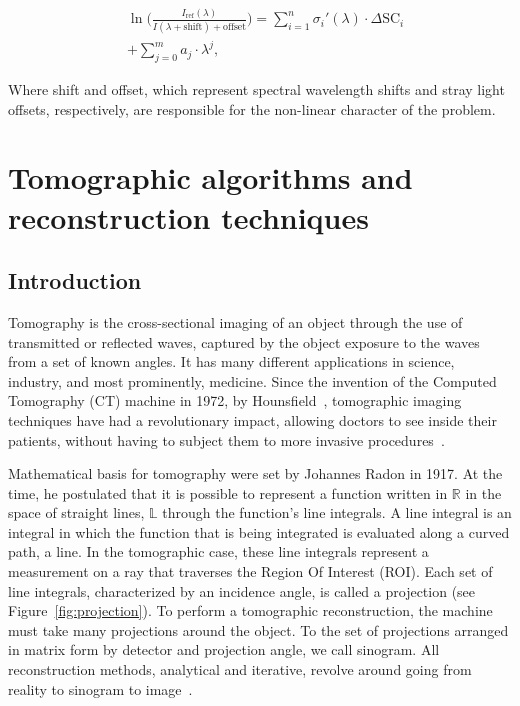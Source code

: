 \begin{align}
      \label{eq:DOAS_nonLinear}
      &\ln\Big( \frac{I_\mathrm{ref}(\lambda)}{I(\lambda + \mathrm{shift}) + \mathrm{offset}} \Big) = \sum_{i = 1}^{n} \sigma_{i}{'}(\lambda) \cdot \Delta \mathrm{SC}_{i} \nonumber\\
      &+ \sum_{j = 0}^{m} a_{j} \cdot \lambda^{j},
\end{align}

Where shift and offset, which represent spectral wavelength shifts and
stray light offsets, respectively, are responsible for the non-linear
character of the problem.


\section{Tomographic algorithms and reconstruction techniques}%
\label{sec:tomographic_algorithms_and_reconstruction_techniques}

\subsection{Introduction}%
\label{sub:tomography_introduction}

Tomography is the cross-sectional imaging of an object through the use
of transmitted or reflected waves, captured by the object exposure to
the waves from a set of known angles. It has many different applications
in science, industry, and most prominently, medicine. Since the
invention of the Computed Tomography (\gls{CT}) machine in 1972, by
Hounsfield~\cite{Gunderman2006}, tomographic imaging techniques have had
a revolutionary impact, allowing doctors to see inside their patients,
without having to subject them to more invasive
procedures~\cite{Kak2001}.

Mathematical basis for tomography were set by Johannes Radon in 1917. At
the time, he postulated that  it is possible to represent a function
written in $\mathbb{R}$ in the space of straight lines, $\mathbb{L}$
through the function's line integrals. A line integral is an integral in
which the function that is being integrated is evaluated along a curved
path, a line. In the tomographic case, these line integrals represent a
measurement on a ray that traverses the Region Of Interest (\gls{ROI}).
Each set of line integrals, characterized by an incidence angle, is
called a projection (see Figure~\ref{fig:projection}). To perform a
tomographic reconstruction, the machine must take many projections
around the object. To the set of projections arranged in matrix form by
detector and projection angle, we call sinogram. All reconstruction
methods, analytical and iterative, revolve around going from reality to
sinogram to image~\cite{Bruyant2002, Kak2001, Herman1973, Herman1995,
Herman2009, Defrise2003}.

